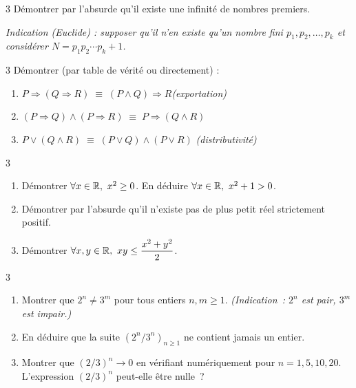 \begin{exo}{3}
D\'emontrer par l'absurde qu'il existe une infinit\'e de nombres premiers.

\emph{Indication (Euclide) : supposer qu'il n'en existe qu'un nombre fini
$p_1, p_2, \ldots, p_k$ et consid\'erer $N = p_1 p_2 \cdots p_k + 1$.}
\end{exo}

\begin{exo}{3}
D\'emontrer (par table de v\'erit\'e ou directement) :
\begin{enumerate}
  \item $P \Rightarrow (Q \Rightarrow R)
        \;\equiv\; (P \land Q) \Rightarrow R$\quad\emph{(exportation)}
  \item $(P \Rightarrow Q) \land (P \Rightarrow R)
        \;\equiv\; P \Rightarrow (Q \land R)$
  \item $P \lor (Q \land R)
        \;\equiv\; (P \lor Q) \land (P \lor R)$
        \quad\emph{(distributivit\'e)}
\end{enumerate}
\end{exo}

\begin{exo}{3}
\begin{enumerate}
  \item D\'emontrer $\forall x \in \mathbb{R},\ x^2 \geq 0$.
        En d\'eduire $\forall x \in \mathbb{R},\ x^2 + 1 > 0$.
  \item D\'emontrer par l'absurde qu'il n'existe pas de plus petit
        r\'eel strictement positif.
  \item D\'emontrer $\forall x, y \in \mathbb{R},\ xy \leq \dfrac{x^2+y^2}{2}$.
\end{enumerate}
\end{exo}

\begin{exo}{3}
\begin{enumerate}
  \item Montrer que $2^n \ne 3^m$ pour tous entiers $n, m \geq 1$.
        \emph{(Indication~: $2^n$ est pair, $3^m$ est impair.)}
  \item En d\'eduire que la suite $(2^n/3^n)_{n\geq1}$ ne contient
        jamais un entier.
  \item Montrer que $(2/3)^n \to 0$ en v\'erifiant num\'eriquement
        pour $n = 1, 5, 10, 20$.
        L'expression $(2/3)^n$ peut-elle \^etre nulle~?
\end{enumerate}
\end{exo}

